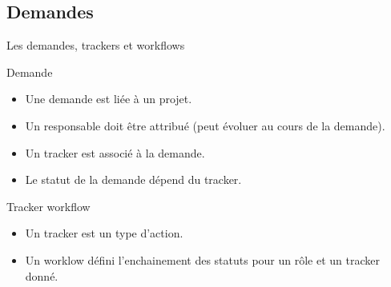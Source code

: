 \documentclass{beamer}
\begin{document}
	

\subsection{Demandes}
\begin{frame}{Les demandes, trackers et workflows}
	\begin{block}{Demande}
		\begin{itemize}		
			\item Une demande est liée à un projet.
			\item Un responsable doit être attribué (peut évoluer au cours de la demande).
			\item Un tracker est associé à la demande.
			\item Le statut de la demande dépend du tracker.
		\end{itemize}
	\end{block}
	\begin{block}{Tracker workflow}
		\begin{itemize}
			\item Un tracker est un type d'action.
			\item Un worklow défini l'enchainement des statuts pour un rôle et un tracker donné.
		\end{itemize}
	\end{block}
\end{frame}
%
%
%
\end{document}
